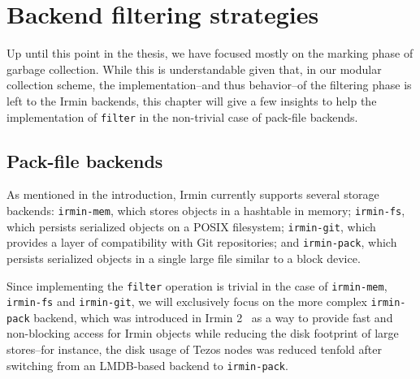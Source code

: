 \section{Backend filtering strategies}

Up until this point in the thesis, we have focused mostly on the marking phase of garbage collection. While this is understandable given that, in our modular collection scheme, the implementation--and thus behavior--of the filtering phase is left to the Irmin backends, this chapter will give a few insights to help the implementation of \texttt{filter} in the non-trivial case of pack-file backends.

\subsection{Pack-file backends}

As mentioned in the introduction, Irmin currently supports several storage backends: \texttt{irmin-mem}, which stores objects in a hashtable in memory; \texttt{irmin-fs}, which persists serialized objects on a POSIX filesystem; \texttt{irmin-git}, which provides a layer of compatibility with Git repositories; and \texttt{irmin-pack}, which persists serialized objects in a single large file similar to a block device.

Since implementing the \texttt{filter} operation is trivial in the case of \texttt{irmin-mem}, \texttt{irmin-fs} and \texttt{irmin-git}, we will exclusively focus on the more complex \texttt{irmin-pack} backend, which was introduced in Irmin 2~\cite{irmin-2-blog} as a way to provide fast and non-blocking access for Irmin objects while reducing the disk footprint of large stores--for instance, the disk usage of Tezos nodes was reduced tenfold after switching from an LMDB-based backend to \texttt{irmin-pack}.

